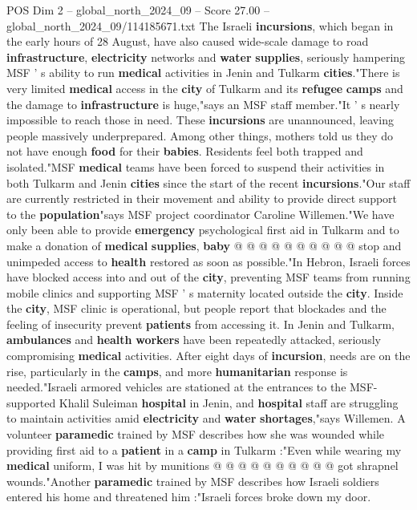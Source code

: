 \begin{textsample}{POS Dim 2 – global\_north\_2024\_09 – Score 27.00 – global\_north\_2024\_09/114185671.txt}  \label{ex:f2_pos_411}
The Israeli \textbf{incursions}, which began in the early hours of 28 August, have also caused wide-scale damage to road \textbf{infrastructure}, \textbf{electricity} networks and \textbf{water} \textbf{supplies}, seriously hampering MSF ' s ability to run \textbf{medical} activities in Jenin and Tulkarm \textbf{cities}."There is very limited \textbf{medical} access in the \textbf{city} of Tulkarm and its \textbf{refugee} \textbf{camps} and the damage to \textbf{infrastructure} is huge,"says an MSF staff member."It ' s nearly impossible to reach those in need.
These \textbf{incursions} are unannounced, leaving people massively underprepared.
Among other things, mothers told us they do not have enough \textbf{food} for their \textbf{babies}.
Residents feel both trapped and isolated."MSF \textbf{medical} teams have been forced to suspend their activities in both Tulkarm and Jenin \textbf{cities} since the start of the recent \textbf{incursions}."Our staff are currently restricted in their movement and ability to provide direct support to the \textbf{population}"says MSF project coordinator Caroline Willemen."We have only been able to provide \textbf{emergency} psychological first aid in Tulkarm and to make a donation of \textbf{medical} \textbf{supplies}, \textbf{baby} @ @ @ @ @ @ @ @ @ @ stop and unimpeded access to \textbf{health} restored as soon as possible."In Hebron, Israeli forces have blocked access into and out of the \textbf{city}, preventing MSF teams from running mobile clinics and supporting MSF ' s maternity located outside the \textbf{city}.
Inside the \textbf{city}, MSF clinic is operational, but people report that blockades and the feeling of insecurity prevent \textbf{patients} from accessing it.
In Jenin and Tulkarm, \textbf{ambulances} and \textbf{health} \textbf{workers} have been repeatedly attacked, seriously compromising \textbf{medical} activities.
After eight days of \textbf{incursion}, needs are on the rise, particularly in the \textbf{camps}, and more \textbf{humanitarian} response is needed."Israeli armored vehicles are stationed at the entrances to the MSF-supported Khalil Suleiman \textbf{hospital} in Jenin, and \textbf{hospital} staff are struggling to maintain activities amid \textbf{electricity} and \textbf{water} \textbf{shortages},"says Willemen.
A volunteer \textbf{paramedic} trained by MSF describes how she was wounded while providing first aid to a \textbf{patient} in a \textbf{camp} in Tulkarm :"Even while wearing my \textbf{medical} uniform, I was hit by munitions @ @ @ @ @ @ @ @ @ @ got shrapnel wounds."Another \textbf{paramedic} trained by MSF describes how Israeli soldiers entered his home and threatened him :"Israeli forces broke down my door.

\end{textsample}
